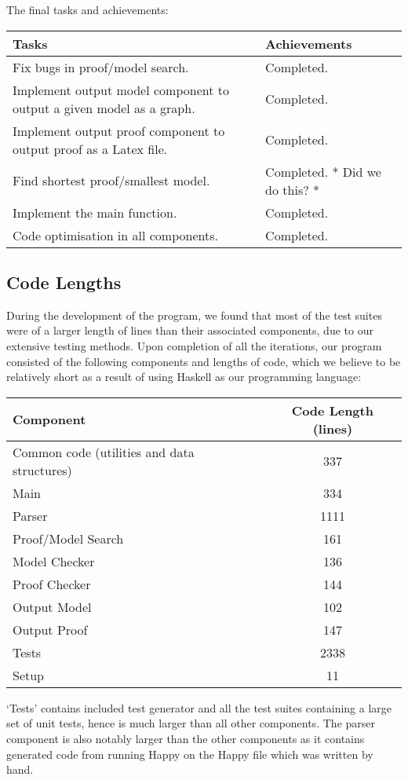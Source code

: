 The final tasks and achievements:

\begin{center}
\begin{longtable}{| p{7cm} | p{8cm} |}
\hline
\textbf{Tasks} & \textbf{Achievements} \\
\hline
Fix bugs in proof/model search. & Completed.\\
\hline
Implement output model component to output a given model as a graph. & Completed.\\
\hline
Implement output proof component to output proof as a Latex file. & Completed.\\
\hline
Find shortest proof/smallest model. & Completed. * Did we do this? *\\
\hline
Implement the main function. & Completed.\\
\hline
Code optimisation in all components. & Completed.\\
\hline
\end{longtable}
\end{center}

\subsection{Code Lengths}

During the development of the program, we found that most of the test suites were of a larger length of lines than their associated components, due to our extensive testing methods. Upon completion of all the iterations, our program consisted of the following components and lengths of code, which we believe to be relatively short as a result of using Haskell as our programming language:

\begin{center}
  \begin{tabular}{|l|c|}
\hline
\textbf{Component} & \textbf{Code Length (lines)} \\
\hline
Common code (utilities and data structures) & 337\\
\hline
Main & 334\\
\hline
Parser & 1111\\
\hline
Proof/Model Search & 161\\
\hline
Model Checker & 136\\
\hline
Proof Checker & 144\\
\hline
Output Model & 102\\
\hline
Output Proof & 147\\
\hline
Tests & 2338\\
\hline
Setup & 11\\
\hline
\end{tabular}
\end{center}

`Tests' contains included test generator and all the test suites containing a large set of unit tests, hence is much larger than all other components. The parser component is also notably larger than the other components as it contains generated code from running Happy on the Happy file which was written by hand.
